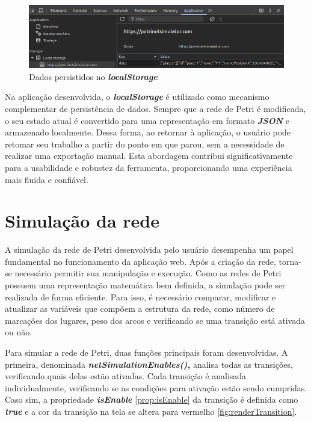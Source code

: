 \documentclass[
	12pt,				%
	openright,			%
	oneside,			%
	a4paper,			%
	english,			%
	brazil				%
	]{abntex2}
\begin{document}


\begin{figure}[ht] 
	\centering
	\includegraphics[scale=0.6]{figuras/localStorage.png}
	\caption[Dados persistidos no localStorage]{Dados persistidos no \textbf{\textit{localStorage}}}
	\label{fig:localStorage}
\end{figure}
\FloatBarrier

Na aplicação desenvolvida, o \textbf{\textit{localStorage}} é utilizado como mecanismo complementar de persistência de dados. Sempre que a rede de Petri é modificada, o seu estado atual é convertido para uma representação em formato \textbf{\textit{JSON}} e armazenado localmente. Dessa forma, ao retornar à aplicação, o usuário pode retomar seu trabalho a partir do ponto em que parou, sem a necessidade de realizar uma exportação manual. Esta abordagem contribui significativamente para a usabilidade e robustez da ferramenta, proporcionando uma experiência mais fluida e confiável. 

\section{Simulação da rede} \label{cap:simulation}

A simulação da rede de Petri desenvolvida pelo usuário desempenha um papel fundamental no funcionamento da aplicação web. Após a criação da rede, torna-se necessário permitir sua manipulação e execução. Como as redes de Petri possuem uma representação matemática bem definida, a simulação pode ser realizada de forma eficiente. Para isso, é necessário comparar, modificar e atualizar as variáveis que compõem a estrutura da rede, como número de marcações dos lugares, peso dos arcos e verificando se uma transição está ativada ou não. 

Para simular a rede de Petri, duas funções principais foram desenvolvidas. A primeira, denominada \textbf{\textit{netSimulationEnables()},} analisa todas as transições, verificando quais delas estão ativadas. Cada transição é analisada individualmente, verificando se as condições para ativação estão sendo cumpridas. Caso sim, a propriedade \textbf{\textit{isEnable}} \ref{prop:isEnable} da transição é definida como \textbf{\textit{true}} e a cor da transição na tela se altera para vermelho \ref{fig:renderTransition}. 
\end{document}

